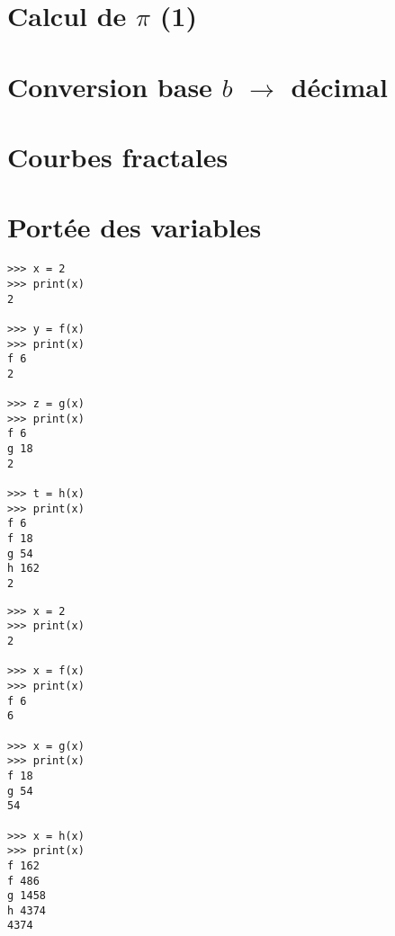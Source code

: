 \documentclass[11pt,a4paper]{article}
\begin{document}

\section{Calcul de $\pi$ (1)}


\section{Conversion base $b$ $\rightarrow$ décimal}


\section{Courbes fractales}
%

{}

\section{Portée des variables}
%

\begin{minipage}[t]{7cm}\footnotesize
\begin{verbatim}
>>> x = 2
>>> print(x)
2

>>> y = f(x)
>>> print(x)
f 6
2

>>> z = g(x)
>>> print(x)
f 6
g 18
2

>>> t = h(x)
>>> print(x)
f 6
f 18
g 54
h 162
2
\end{verbatim}
\end{minipage}
\hfill
\begin{minipage}[t]{7cm}\footnotesize
\begin{verbatim}
>>> x = 2
>>> print(x)
2

>>> x = f(x)
>>> print(x)
f 6
6

>>> x = g(x)
>>> print(x)
f 18
g 54
54

>>> x = h(x)
>>> print(x)
f 162
f 486
g 1458
h 4374
4374
\end{verbatim}
\end{minipage}
\end{document}
